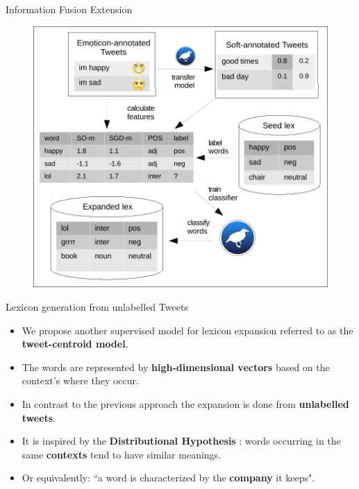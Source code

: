 \documentclass[handout]{beamer}
\begin{document}
\begin{frame}{Information Fusion Extension}

\begin{figure}[htb]
	\centering
	 \includegraphics[scale=0.6]{infus.pdf}
\end{figure}



\end{frame}



\begin{frame}{Lexicon generation from unlabelled Tweets}
\begin{scriptsize}
\begin{itemize}
\item We propose another supervised model for lexicon expansion referred to as the \textbf{tweet-centroid model}.
\item The words are represented by \textbf{high-dimensional vectors} based on the context's where they occur. 
\item In contrast to the previous approach the expansion is done from \textbf{unlabelled tweets}.
\item It is inspired by the \textbf{Distributional Hypothesis} \cite{harris1954}: words occurring in the same \textbf{contexts} tend to have similar meanings.
\item Or equivalently: ``a word is characterized by the \textbf{company} it keeps".
\end{itemize}
\end{scriptsize}
\end{frame}
\end{document}
